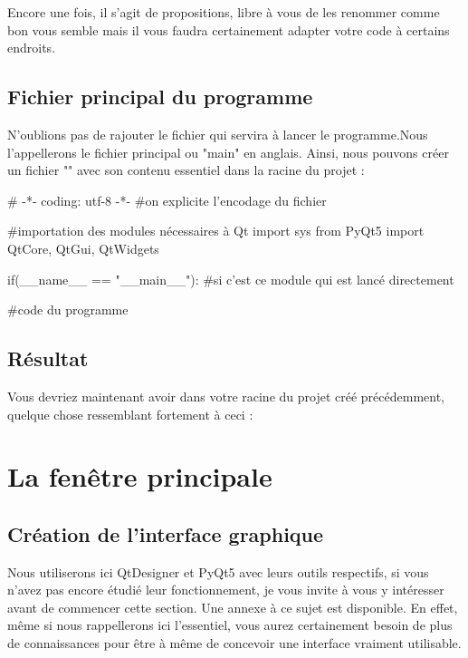 Encore une fois, il s'agit de propositions, libre à vous de les renommer comme bon vous semble mais il vous faudra certainement adapter votre code à certains endroits.

\subsection{Fichier principal du programme}

N'oublions pas de rajouter le fichier qui servira à lancer le programme.Nous l'appellerons le fichier principal ou "main" en anglais.\newline
Ainsi, nous pouvons créer un fichier "" avec son contenu essentiel dans la racine du projet :

\begin{Python}
# -*- coding: utf-8 -*-
#on explicite l'encodage du fichier

#importation des modules nécessaires à Qt
import sys
from PyQt5 import QtCore, QtGui, QtWidgets


if(__name__ == "__main__"): #si c'est ce module qui est lancé directement

	#code du programme

\end{Python}

\subsection{Résultat}

Vous devriez maintenant avoir dans votre racine du projet créé précédemment, quelque chose ressemblant fortement à ceci :



\section{La fenêtre principale}

\subsection{Création de l'interface graphique}

Nous utiliserons ici QtDesigner et PyQt5 avec leurs outils respectifs, si vous n'avez pas encore étudié leur fonctionnement, je vous invite à vous y intéresser avant de commencer cette section. Une annexe à ce sujet est disponible.\newline
En effet, même si nous rappellerons ici l'essentiel, vous aurez certainement besoin de plus de connaissances pour être à même de concevoir une interface vraiment utilisable.

